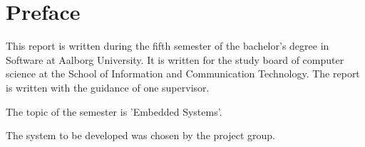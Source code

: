 \chapter*{Preface}
This report is written during the fifth semester of the bachelor's degree in Software at Aalborg University.
It is written for the study board of computer science at the School of Information and Communication Technology.
The report is written with the guidance of one supervisor.

The topic of the semester is 'Embedded Systems'.

The system to be developed was chosen by the project group.



\newpage
